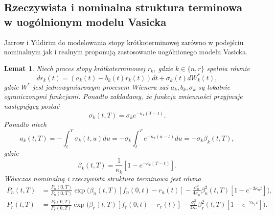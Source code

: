 \documentclass{mini}
\theoremstyle{mythstyle}
\newtheorem{Lemat}{Lemat}[chapter]
\begin{document}
	\subsection{Rzeczywista i nominalna struktura terminowa w uogólnionym modelu Vasicka}
	Jarrow i Yildirim do modelowania stopy krótkoterminowej zarówno w podejściu nominalnym jak i realnym proponują zastosowanie uogólnionego modelu Vasicka. \\
	\begin{Lemat}
		Niech proces stopy krótkoterminowej $r_k$, gdzie $k \in \{n, r\}$ spełnia równie
		\begin{equation}
		dr_k(t) = (a_k(t) - b_k(t)r_k(t))dt + \sigma_k(t)dW^*_k(t),
		\end{equation}
		gdzie $W^*$ jest jednowymiarowym procesem Wienera zaś $a_k, b_k, \sigma_k$ są lokalnie ograniczonymi funkcjami. Ponadto zakładamy, że funkcja zmienności przyjmuje następującą postać
		\begin{equation}
		\sigma_k(t,T) = \sigma_k e^{-\kappa_k (T-t)}.
		\end{equation}
		Ponadto niech
		\begin{equation}
		a_k(t,T) = - \int_t^T \sigma_k(t,u) du = -\sigma_k \int_t^T e^{-\kappa_k(u-t)}du = -\sigma_k\beta_k(t,T),
		\end{equation}
		gdzie 
		\begin{equation}
		\beta_k(t,T) = \frac{1}{\kappa_k} [1 - e^{-\kappa_k(T-t)}].
		\end{equation}
		Wówczas nominalną i rzeczywista struktura terminowa jest równa
		\begin{align}
		P_n(t, T) &= \frac{P_n(0,T)}{P_n(0,T)} \exp\bigg( \beta_n (t, T) [f_n(0,t) - r_n(t) ]  - \frac{\sigma_n^2}{4\kappa_n} \beta_n^2(t,T) [1 - e^{-2\kappa_n t}] \bigg),\\
		P_r(t, T) &= \frac{P_r(0,T)}{P_r(0,T)} \exp\bigg( \beta_r (t, T) [f_r(0,t) - r_r(t) ]  - \frac{\sigma_r^2}{4\kappa_r} \beta_r^2(t,T) [1 - e^{-2\kappa_rt}] \bigg).
		\end{align}
	\end{Lemat}
\end{document}
